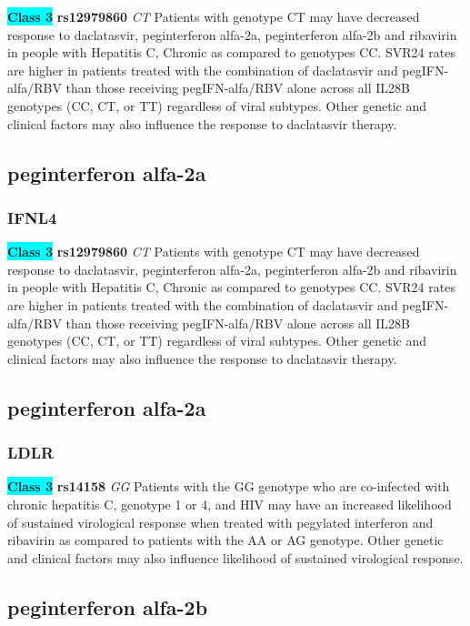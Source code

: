 \documentclass{book}
\begin{document}
\begin{center}
\textbf{\colorbox{cyan} {Class 3}} \textbf{ rs12979860 } \textit{ CT }
Patients with genotype CT may have decreased response to daclatasvir, peginterferon alfa-2a, peginterferon alfa-2b and ribavirin in people with Hepatitis C, Chronic as compared to genotypes CC. SVR24 rates are higher in patients treated with the combination of daclatasvir and pegIFN-alfa/RBV than those receiving pegIFN-alfa/RBV alone across all IL28B genotypes (CC, CT, or TT) regardless of viral subtypes. Other genetic and clinical factors may also influence the response to daclatasvir therapy.


\end{center}\subsection{ peginterferon alfa-2a }


\subsubsection{ IFNL4 }

\begin{center}
\textbf{\colorbox{cyan} {Class 3}} \textbf{ rs12979860 } \textit{ CT }
Patients with genotype CT may have decreased response to daclatasvir, peginterferon alfa-2a, peginterferon alfa-2b and ribavirin in people with Hepatitis C, Chronic as compared to genotypes CC. SVR24 rates are higher in patients treated with the combination of daclatasvir and pegIFN-alfa/RBV than those receiving pegIFN-alfa/RBV alone across all IL28B genotypes (CC, CT, or TT) regardless of viral subtypes. Other genetic and clinical factors may also influence the response to daclatasvir therapy.


\end{center}\subsection{ peginterferon alfa-2a }


\subsubsection{ LDLR }

\begin{center}
\textbf{\colorbox{cyan} {Class 3}} \textbf{ rs14158 } \textit{ GG }
Patients with the GG genotype who are co-infected with chronic hepatitis C, genotype 1 or 4, and HIV may have an increased likelihood of sustained virological response when treated with pegylated interferon and ribavirin as compared to patients with the AA or AG genotype. Other genetic and clinical factors may also influence likelihood of sustained virological response. 


\end{center}\subsection{ peginterferon alfa-2b }
\end{document}
